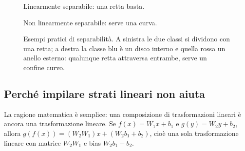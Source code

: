 \begin{figure}[htbp]
  \centering
  \begin{minipage}{0.47\textwidth}
    \centering
    \par\small Linearmente separabile: una retta basta.
  \end{minipage}
  \hfill
  \begin{minipage}{0.47\textwidth}
    \centering
    \par\small Non linearmente separabile: serve una curva.
  \end{minipage}
  \caption{Esempi pratici di separabilità. A sinistra le due classi si dividono
  con una retta; a destra la classe blu è un disco interno e quella rossa un
  anello esterno: qualunque retta attraversa entrambe, serve un confine curvo.}
  \label{fig:linearita-esempi}
\end{figure}

\subsection{Perché impilare strati lineari non aiuta}\label{sec:nonlinear-matematica}

La ragione matematica è semplice: una composizione di trasformazioni lineari
è ancora una trasformazione lineare. Se $f(x) = W_1 x + b_1$ e
$g(y) = W_2 y + b_2$, allora
$g(f(x)) = (W_2 W_1) x + (W_2 b_1 + b_2)$, cioè una sola trasformazione
lineare con matrice $W_2 W_1$ e bias $W_2 b_1 + b_2$.

